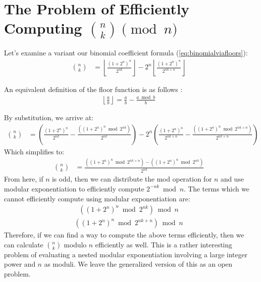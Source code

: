 \documentclass{article}
\theoremstyle{plain}
\theoremstyle{definition}
\begin{document}
\section[The Problem of Efficiently Computing n choose k Modulo n]{The Problem of Efficiently Computing \( \binom{n}{k} \pmod{n} \)}

Let's examine a variant our binomial coefficient formula (\ref{eq:binomialviafloors}):
\begin{align*}
    \binom{n}{k} &= \left\lfloor\frac{(1 + 2^{n})^{n}}{2^{n k}}\right\rfloor - 2^{n} \left\lfloor \frac{(1 + 2^{n})^{n}}{2^{n k + n}} \right\rfloor
\end{align*}

An equivalent definition of the floor function is as follows \cite{niven2008introduction}:
\begin{align}
    \left\lfloor \frac{a}{b} \right\rfloor = \frac{a}{b} - \frac{a \bmod{b}}{b}
\end{align}

By substitution, we arrive at:
\begin{align}
    \binom{n}{k} &= \left(\frac{(1 + 2^{n})^{n}}{2^{nk}} - \frac{((1 + 2^{n})^{n} \bmod{2^{nk}})}{2^{nk}}\right) - 2^{n} \left( \frac{(1 + 2^{n})^{n}}{2^{nk+n}} - \frac{((1 + 2^{n})^{n} \bmod{2^{nk+n}})}{2^{nk+n}} \right)
\end{align}
Which simplifies to:
\begin{align}
    \binom{n}{k} &= \frac{((1 + 2^{n})^{n} \bmod{2^{nk+n}}) - ((1 + 2^{n})^{n} \bmod{2^{nk}})}{2^{nk}}
\end{align}
From here, if $n$ is odd, then we can distribute the mod operation for $n$ and use modular exponentiation to efficiently compute $2^{-nk} \bmod{n}$. The terms which we cannot efficiently compute using modular exponentiation are:
\begin{align}
    \left((1 + 2^{n})^{n} \bmod{2^{nk}}\right) \bmod{n}
\end{align}
\begin{align}
    \left((1 + 2^{n})^{n} \bmod{2^{nk+n}}\right) \bmod{n}
\end{align}
Therefore, if we can find a way to compute the above terms efficiently, then we can calculate \( \binom{n}{k} \) modulo \( n \) efficiently as well. This is a rather interesting problem of evaluating a nested modular exponentiation involving a large integer power and \( n \) as moduli. We leave the generalized version of this as an open problem.
\end{document}

